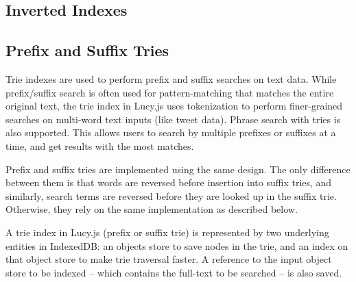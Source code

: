 \documentclass{vldb}
\begin{document}
\subsection{Inverted Indexes}



\subsection{Prefix and Suffix Tries}

Trie indexes are used to perform prefix and suffix searches on text data. While prefix/suffix search is often used for pattern-matching that matches the entire original text, the trie index in Lucy.js uses tokenization to perform finer-grained searches on multi-word text inputs (like tweet data). Phrase search with tries is also supported. This allows users to search by multiple prefixes or suffixes at a time, and get results with the most matches.

Prefix and suffix tries are implemented using the same design. The only difference between them is that words are reversed before insertion into suffix tries, and similarly, search terms are reversed before they are looked up in the suffix trie. Otherwise, they rely on the same implementation as described below.

A trie index in Lucy.js (prefix or suffix trie) is represented by two underlying entities in IndexedDB: an objects store to save nodes in the trie, and an index on that object store to make trie traversal faster.  A reference to the input object store to be indexed -- which contains the full-text to be searched -- is also saved.
\end{document}
